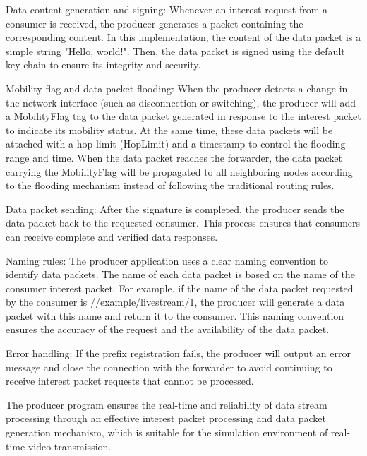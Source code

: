 \documentclass[conference]{IEEEtran}
\begin{document}
Data content generation and signing: Whenever an interest request from a consumer is received, the producer generates a packet containing the corresponding content. In this implementation, the content of the data packet is a simple string "Hello, world!". Then, the data packet is signed using the default key chain to ensure its integrity and security.

Mobility flag and data packet flooding: When the producer detects a change in the network interface (such as disconnection or switching), the producer will add a MobilityFlag tag to the data packet generated in response to the interest packet to indicate its mobility status. At the same time, these data packets will be attached with a hop limit (HopLimit) and a timestamp to control the flooding range and time. When the data packet reaches the forwarder, the data packet carrying the MobilityFlag will be propagated to all neighboring nodes according to the flooding mechanism instead of following the traditional routing rules.

Data packet sending: After the signature is completed, the producer sends the data packet back to the requested consumer. This process ensures that consumers can receive complete and verified data responses.

Naming rules: The producer application uses a clear naming convention to identify data packets. The name of each data packet is based on the name of the consumer interest packet. For example, if the name of the data packet requested by the consumer is //example/livestream/1, the producer will generate a data packet with this name and return it to the consumer. This naming convention ensures the accuracy of the request and the availability of the data packet.

Error handling: If the prefix registration fails, the producer will output an error message and close the connection with the forwarder to avoid continuing to receive interest packet requests that cannot be processed.

The producer program ensures the real-time and reliability of data stream processing through an effective interest packet processing and data packet generation mechanism, which is suitable for the simulation environment of real-time video transmission.
\end{document}
